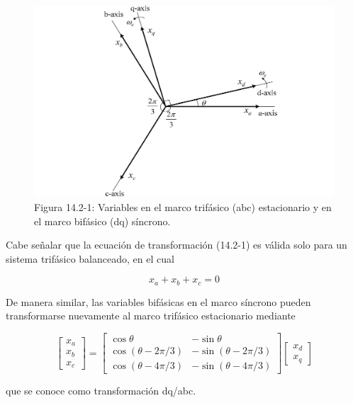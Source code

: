 \documentclass[letterpaper,12pt]{article}
\begin{document}
\begin{figure}[ht]
\centering
\includegraphics{graficos/img01.jpg}
\caption{Figura 14.2-1: Variables en el marco trifásico (abc) estacionario y en el marco bifásico (dq) síncrono.}
\end{figure}
\FloatBarrier

\clearpage
Cabe señalar que la ecuación de transformación (14.2-1) es válida solo para un sistema trifásico balanceado, en el cual

\begin{equation}
x_a + x_b + x_c = 0 \tag{14.2-4}
\end{equation}

De manera similar, las variables bifásicas en el marco síncrono pueden transformarse nuevamente al marco trifásico estacionario mediante

\begin{equation}
\begin{bmatrix}
x_a \\
x_b \\
x_c
\end{bmatrix}
=
\begin{bmatrix}
\cos \theta & -\sin \theta \\
\cos(\theta - 2\pi/3) & -\sin(\theta - 2\pi/3) \\
\cos(\theta - 4\pi/3) & -\sin(\theta - 4\pi/3)
\end{bmatrix}
\begin{bmatrix}
x_d \\
x_q
\end{bmatrix} \tag{14.2-5}
\end{equation}

que se conoce como transformación dq/abc.
\end{document}

